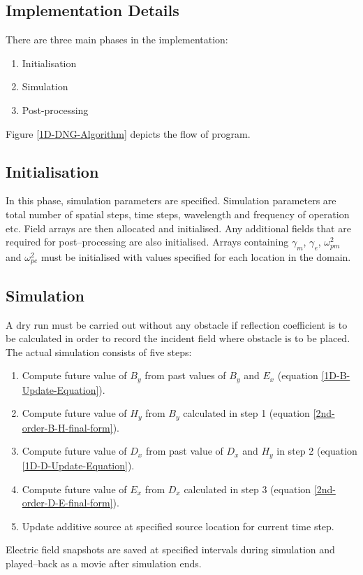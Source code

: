 \subsection{Implementation Details}
There are three main phases in the implementation:
\begin{enumerate}
\item Initialisation
\item Simulation
\item Post-processing
\end{enumerate}
Figure \ref{1D-DNG-Algorithm} depicts the flow of program.
\subsection{Initialisation}
In this phase, simulation parameters are specified. Simulation parameters are total number of spatial steps, time steps, wavelength and frequency of operation etc. Field arrays are then allocated and initialised. Any additional fields that are required for post--processing are also initialised. Arrays containing $\gamma_m$, $\gamma_e$, $\omega^2_{pm}$ and $\omega^2_{pe}$ must be initialised with values specified for each location in the domain.
\subsection{Simulation}
A dry run must be carried out without any obstacle if reflection coefficient is to be calculated in order to record the incident field where obstacle is to be placed. The actual simulation consists of five steps:
\begin{enumerate}
\item Compute future value of $B_y$ from past values of $B_y$ and $E_x$ (equation \ref{1D-B-Update-Equation}).
\item Compute future value of $H_y$ from $B_y$ calculated in step 1 (equation \ref{2nd-order-B-H-final-form}).
\item Compute future value of $D_x$ from past value of $D_x$ and $H_y$ in step 2 (equation \ref{1D-D-Update-Equation}).
\item Compute future value of $E_x$ from $D_x$ calculated in step 3 (equation \ref{2nd-order-D-E-final-form}).
\item Update additive source at specified source location for current time step.
\end{enumerate}
Electric field snapshots are saved at specified intervals during simulation and played--back as a movie after simulation ends. 
